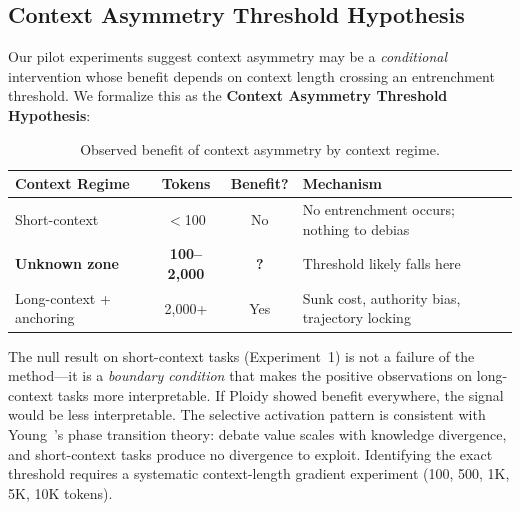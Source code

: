 \documentclass[11pt]{article}
\begin{document}
\subsection{Context Asymmetry Threshold Hypothesis}
\label{sec:threshold}

Our pilot experiments suggest context asymmetry may be a \emph{conditional} intervention whose benefit depends on context length crossing an entrenchment threshold. We formalize this as the \textbf{Context Asymmetry Threshold Hypothesis}:

\begin{table}[H]
\centering
\caption{Observed benefit of context asymmetry by context regime.}
\label{tab:threshold}
\small
\begin{tabular}{@{}lccl@{}}
\toprule
\textbf{Context Regime} & \textbf{Tokens} & \textbf{Benefit?} & \textbf{Mechanism} \\
\midrule
Short-context & $<$100 & No & No entrenchment occurs; nothing to debias \\
\textbf{Unknown zone} & \textbf{100--2,000} & \textbf{?} & Threshold likely falls here \\
Long-context + anchoring & 2,000+ & Yes & Sunk cost, authority bias, trajectory locking \\
\bottomrule
\end{tabular}
\end{table}

The null result on short-context tasks (Experiment~1) is not a failure of the method---it is a \emph{boundary condition} that makes the positive observations on long-context tasks more interpretable. If Ploidy showed benefit everywhere, the signal would be less interpretable. The selective activation pattern is consistent with Young~\citep{young2026divergence}'s phase transition theory: debate value scales with knowledge divergence, and short-context tasks produce no divergence to exploit. Identifying the exact threshold requires a systematic context-length gradient experiment (100, 500, 1K, 5K, 10K tokens).
\end{document}
